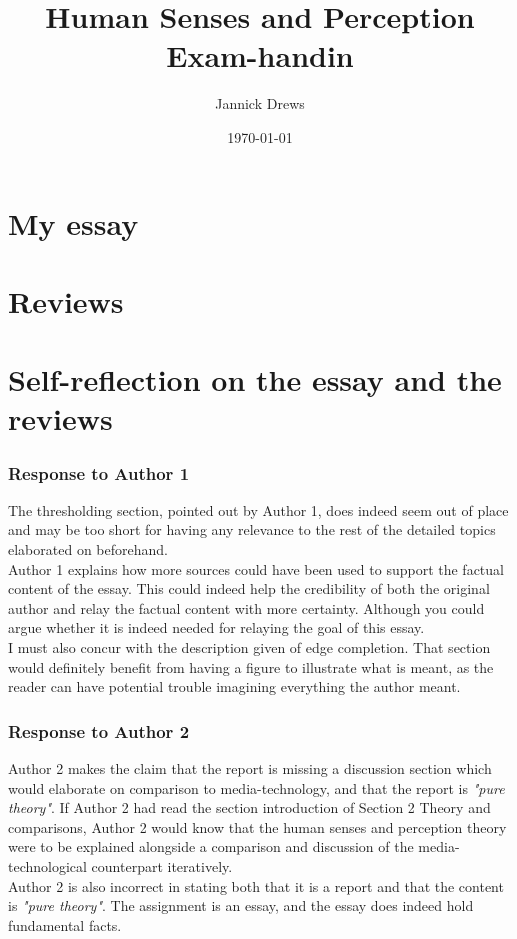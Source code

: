 \documentclass{article}
\title{Human Senses and Perception Exam-handin}
\author{Jannick Drews}
\date{\today}
\begin{document}
\maketitle
\newpage

\section{My essay}


\section{Reviews}
\small


\newpage

\newpage
\section{Self-reflection on the essay and the reviews}
\subsubsection{Response to Author 1}
The thresholding section, pointed out by Author 1, does indeed seem out of place and may be too short for having any relevance to the rest of the detailed topics elaborated on beforehand.\\

Author 1 explains how more sources could have been used to support the factual content of the essay. This could indeed help the credibility of both the original author and relay the factual content with more certainty. Although you could argue whether it is indeed needed for relaying the goal of this essay.\\

I must also concur with the description given of edge completion. That section would definitely benefit from having a figure to illustrate what is meant, as the reader can have potential trouble imagining everything the author meant.

\subsubsection{Response to Author 2}
Author 2 makes the claim that the report is missing a discussion section which would elaborate on comparison to media-technology, and that the report is \textit{"pure theory"}. If Author 2 had read the section introduction of Section 2 Theory and comparisons, Author 2 would know that the human senses and perception theory were to be explained alongside a comparison and discussion of the media-technological counterpart iteratively.\\Author 2 is also incorrect in stating both that it is a report and that the content is \textit{"pure theory"}. The assignment is an essay, and the essay does indeed hold fundamental facts.\\
\end{document}

